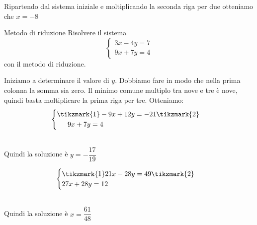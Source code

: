 Ripartendo dal sistema iniziale e moltiplicando la seconda riga per due otteniamo che $x=-8$
\begin{esempiot} {Metodo di riduzione}{}
	Risolvere il sistema \[
	\begin{cases}
	3x-4y=7\\
	9x+7y=4
	\end{cases}\]
con il metodo di riduzione.
\end{esempiot}
Iniziamo a determinare il valore di $y$. Dobbiamo fare in modo che nella prima colonna la somma sia zero. Il minimo comune multiplo tra nove e tre  è nove, quindi basta moltiplicare la prima riga per tre. Otteniamo:
\newpage
\[
\begin{cases}
\tikzmark{1}-9x+12y=-21\tikzmark{2}\\
\phantom{++}9x+7y=4
\end{cases}\]
\\
 Quindi la soluzione è $y=-\dfrac{17}{19}$
 
\[
\begin{cases}
\tikzmark{1}21x-28y=49\tikzmark{2}\\
27x+28y=12
\end{cases}\]
\\ 

Quindi la soluzione è $x=\dfrac{61}{48}$
